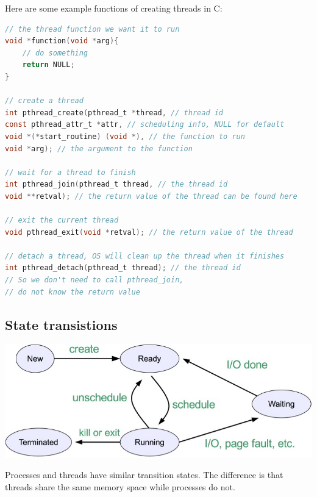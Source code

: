 \documentclass[letterpaper,12pt]{article}
\begin{document}
Here are some example functions of creating threads in C:
\begin{lstlisting}[language=C]
// the thread function we want it to run
void *function(void *arg){
    // do something
    return NULL;
}

// create a thread
int pthread_create(pthread_t *thread, // thread id
const pthread_attr_t *attr, // scheduling info, NULL for default
void *(*start_routine) (void *), // the function to run
void *arg); // the argument to the function

// wait for a thread to finish
int pthread_join(pthread_t thread, // the thread id
void **retval); // the return value of the thread can be found here

// exit the current thread
void pthread_exit(void *retval); // the return value of the thread

// detach a thread, OS will clean up the thread when it finishes
int pthread_detach(pthread_t thread); // the thread id
// So we don't need to call pthread_join, 
// do not know the return value
\end{lstlisting}
\subsection{State transistions}
\includegraphics*[scale = 0.7]{./Images/State Transition.jpg}

Processes and threads have similar transition states. The difference is that threads share the same memory space while processes do not.
\end{document}
